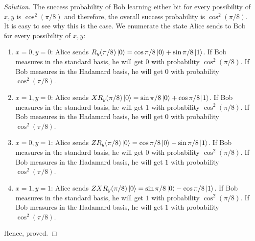 \begin{solution}[label=ques:1a]
\begin{proof}[Solution]
    The success probability of Bob learning either bit for every possibility of $x, y$ is $\cos^2(\pi/8)$ and therefore, the overall success probability is $\cos^2(\pi/8)$. It is easy to see why this is the case. We enumerate the state Alice sends to Bob for every possibility of $x, y$:
    \begin{enumerate}
      \item $x = 0, y = 0$: Alice sends $R_y(\pi/8)\ket{0} = \cos\pi/8\ket{0} + \sin\pi/8\ket{1}$. If Bob measures in the standard basis, he will get $0$ with probability $\cos^2(\pi/8)$. If Bob measures in the Hadamard basis, he will get $0$ with probability $\cos^2(\pi/8)$.
      \item $x = 1, y = 0$: Alice sends $XR_y(\pi/8)\ket{0} = \sin\pi/8\ket{0} + \cos\pi/8\ket{1}$. If Bob measures in the standard basis, he will get $1$ with probability $\cos^2(\pi/8)$. If Bob measures in the Hadamard basis, he will get $0$ with probability $\cos^2(\pi/8)$.
      \item $x = 0, y = 1$: Alice sends $ZR_y(\pi/8)\ket{0} = \cos\pi/8\ket{0} - \sin\pi/8\ket{1}$. If Bob measures in the standard basis, he will get $0$ with probability $\cos^2(\pi/8)$. If Bob measures in the Hadamard basis, he will get $1$ with probability $\cos^2(\pi/8)$.
      \item $x = 1, y = 1$: Alice sends $ZXR_y(\pi/8)\ket{0} = \sin\pi/8\ket{0} - \cos\pi/8\ket{1}$. If Bob measures in the standard basis, he will get $1$ with probability $\cos^2(\pi/8)$. If Bob measures in the Hadamard basis, he will get $1$ with probability $\cos^2(\pi/8)$.
    \end{enumerate}
    Hence, proved.
  \end{proof}
\end{solution}

